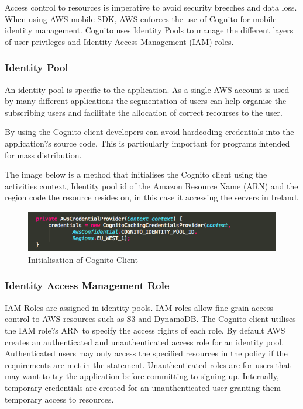 \documentclass[a4paper, 11pt]{article}
\begin{document}
Access control to resources is imperative to avoid security breeches and data loss. When using AWS mobile SDK, AWS enforces the use of Cognito for mobile identity management. Cognito uses Identity Pools to manage the different layers of user privileges and Identity Access Management (IAM) roles.

\subsubsection{Identity Pool}
An identity pool is specific to the application. As a single AWS account is used by many different applications the segmentation of users can help organise the subscribing users and facilitate the allocation of correct recourses to the user. 

By using the Cognito client developers can avoid hardcoding credentials into the application?s source code. This is particularly important for programs intended for mass distribution. 

The image below is a method that initialises the Cognito client using the activities context, Identity pool id of the Amazon Resource Name (ARN) and the region code the resource resides on, in this case it accessing the servers in Ireland.  

\begin{figure}[h]
\centering
\includegraphics[width=\textwidth]{cognito_client_code.png}
\caption{Initialisation of Cognito Client}
\end{figure}

\subsubsection{Identity Access Management Role}
IAM Roles are assigned in identity pools. IAM roles allow fine grain access control to AWS resources such as S3 and DynamoDB. The Cognito client utilises the IAM role?s ARN to specify the access rights of each role. By default AWS creates an authenticated and unauthenticated access role for an identity pool. Authenticated users may only access the specified resources in the policy if the requirements are met in the statement. Unauthenticated roles are for users that may want to try the application before committing to signing up. Internally, temporary credentials are created for an unauthenticated user granting them temporary access to resources. 
\end{document}
